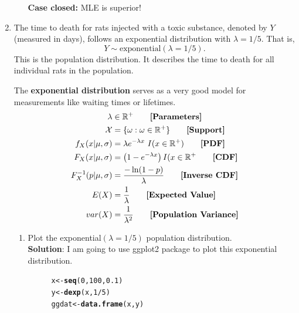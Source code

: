 \documentclass{article}\usepackage[]{graphicx}\usepackage[]{color}
\makeatletter
\newcommand{\hlnum}[1]{\textcolor[rgb]{0.686,0.059,0.569}{#1}}%
\newcommand{\hlopt}[1]{\textcolor[rgb]{0,0,0}{#1}}%
\newcommand{\hlstd}[1]{\textcolor[rgb]{0.345,0.345,0.345}{#1}}%
\newcommand{\hlkwb}[1]{\textcolor[rgb]{0.69,0.353,0.396}{#1}}%
\newcommand{\hlkwd}[1]{\textcolor[rgb]{0.737,0.353,0.396}{\textbf{#1}}}%
\newenvironment{kframe}{%
 \def\at@end@of@kframe{}%
 \ifinner\ifhmode%
  \def\at@end@of@kframe{\end{minipage}}%
  \begin{minipage}{\columnwidth}%
 \fi\fi%
 \def\FrameCommand##1{\hskip\@totalleftmargin \hskip-\fboxsep
 \colorbox{shadecolor}{##1}\hskip-\fboxsep
     \hskip-\linewidth \hskip-\@totalleftmargin \hskip\columnwidth}%
 \MakeFramed {\advance\hsize-\width
   \@totalleftmargin\z@ \linewidth\hsize
   \@setminipage}}%
 {\par\unskip\endMakeFramed%
 \at@end@of@kframe}
\newenvironment{knitrout}{}{} %
\makeatother
\begin{document}
\begin{enumerate}
\begin{enumerate}
\textbf{Case closed:} MLE is superior! 
	\end{enumerate}
\newpage
\item The time to death for rats injected with a toxic substance, denoted by $Y$
	(measured in days), follows an exponential distribution with $\lambda = 1/5$. That is,
	\[Y \sim \textrm{exponential}(\lambda = 1/5).\]
	This is the population distribution. It describes the time to death for all individual rats in the population.

  The \textbf{exponential distribution} serves as a very good model for measurements like waiting times or lifetimes.
  \begin{align*}
  \lambda &\in \mathbb{R^+}  \tag*{\textbf{[Parameters]}}\\
  \mathcal{X}&= \{\omega: \omega \in \mathbb{R^+}\} \tag*{\textbf{[Support]}}\\
  f_X(x|\mu,\sigma) &= \lambda e^{-\lambda x}~ I(x \in \mathbb{R^+}) \tag*{\textbf{[PDF]}}\\
  F_X(x|\mu,\sigma) &= \left(1- e^{-\lambda x}\right)I(x \in \mathbb{R^+}\tag*{\textbf{[CDF]}}\\
  F_X^{-1}(p|\mu,\sigma) &= \frac{-\ln(1-p)}{\lambda} \tag*{\textbf{[Inverse CDF]}}\\
  E(X) &= \frac{1}{\lambda} \tag*{\textbf{[Expected Value]}}\\
  var(X) &= \frac{1}{\lambda^2}\tag*{\textbf{[Population Variance]}}\\
  \end{align*}
	\begin{enumerate}
	  \item Plot the exponential$(\lambda = 1/5)$ population distribution.\\
	  \textbf{Solution}: I am going to use ggplot2 package \cite{ggplot} to plot this exponential distribution.
\begin{figure}[H]
\begin{center}
\begin{knitrout}
\color{fgcolor}\begin{kframe}
\begin{alltt}
\hlstd{x}\hlkwb{<-}\hlkwd{seq}\hlstd{(}\hlnum{0}\hlstd{,} \hlnum{100}\hlstd{,} \hlnum{0.1}\hlstd{)}
\hlstd{y}\hlkwb{<-}\hlkwd{dexp}\hlstd{(x,} \hlnum{1}\hlopt{/}\hlnum{5}\hlstd{)}
\hlstd{ggdat}\hlkwb{<-}\hlkwd{data.frame}\hlstd{(x,y)}


\end{alltt}
\end{kframe}
\end{knitrout}
\end{center}
\end{figure}
\end{enumerate}
\end{enumerate}
\end{document}
